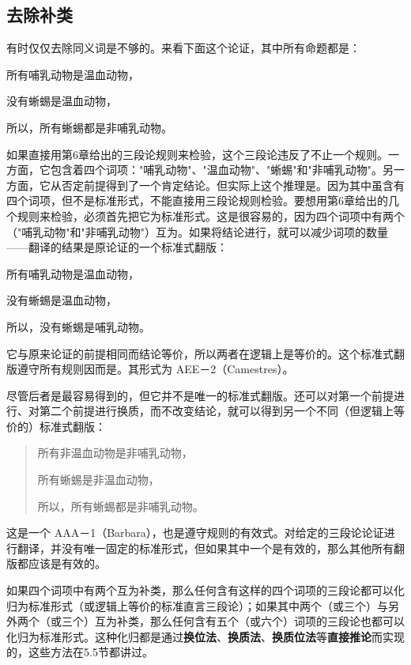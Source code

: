 \subsection{去除补类}
\begin{examplebox}[title=去除补类的方法]
有时仅仅去除同义词是不够的。来看下面这个论证，其中所有命题都是：

所有哺乳动物是温血动物，

没有蜥蜴是温血动物，

所以，所有蜥蜴都是非哺乳动物。

如果直接用第6章给出的三段论规则来检验，这个三段论违反了不止一个规则。一方面，它包含着四个词项："哺乳动物"、"温血动物"、"蜥蜴"和"非哺乳动物"。另一方面，它从否定前提得到了一个肯定结论。但实际上这个推理是。因为其中虽含有四个词项，但不是标准形式，不能直接用三段论规则检验。要想用第6章给出的几个规则来检验，必须首先把它为标准形式。这是很容易的，因为四个词项中有两个（"哺乳动物"和"非哺乳动物"）互为。如果将结论进行，就可以减少词项的数量——翻译的结果是原论证的一个标准式翻版：

所有哺乳动物是温血动物，

没有蜥蜴是温血动物，

所以，没有蜥蜴是哺乳动物。

它与原来论证的前提相同而结论等价，所以两者在逻辑上是等价的。这个标准式翻版遵守所有规则因而是。其形式为 AEE－2（Camestres）。
\end{examplebox}

尽管后者是最容易得到的，但它并不是唯一的标准式翻版。还可以对第一个前提进行、对第二个前提进行换质，而不改变结论，就可以得到另一个不同（但逻辑上等价的）标准式翻版：

\begin{quote}
所有非温血动物是非哺乳动物，

所有蜥蜴是非温血动物，

所以，所有蜥蜴都是非哺乳动物。
\end{quote}

这是一个 AAA－1（Barbara），也是遵守规则的有效式。对给定的三段论论证进行翻译，并没有唯一固定的标准形式，但如果其中一个是有效的，那么其他所有翻版都应该是有效的。

如果四个词项中有两个互为补类，那么任何含有这样的四个词项的三段论都可以化归为标准形式（或逻辑上等价的标准直言三段论）；如果其中两个（或三个）与另外两个（或三个）互为补类，那么任何含有五个（或六个）词项的三段论也都可以化归为标准形式。这种化归都是通过\textbf{换位法}、\textbf{换质法}、\textbf{换质位法}等\textbf{直接推论}而实现的，这些方法在5.5节都讲过。

